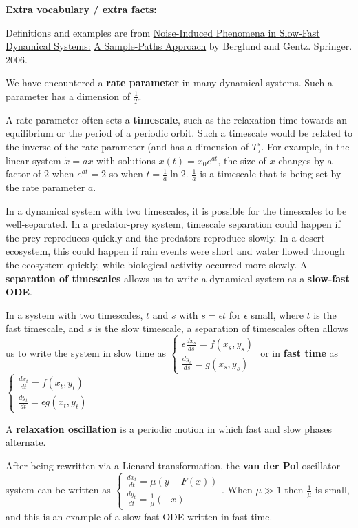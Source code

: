 \documentclass[12pt,letterpaper,noanswers]{exam}
\begin{document}
\noindent \textbf{Extra vocabulary / extra facts:}
\begin{tcolorbox}
Definitions and examples are from \underline{Noise-Induced Phenomena in Slow-Fast Dynamical Systems:} \underline{A Sample-Paths Approach} by Berglund and Gentz.  Springer.  2006.

We have encountered a \textbf{rate parameter} in many dynamical systems.  Such a parameter has a dimension of $\frac{1}{T}$.  

A rate parameter often sets a \textbf{timescale}, such as the relaxation time towards an equilibrium or the period of a periodic orbit.  Such a timescale would be related to the inverse of the rate parameter (and has a dimension of $T$).  For example, in the linear system $\dot x = a x$ with solutions $x(t) = x_0e^{at}$, the size of $x$ changes by a factor of $2$ when $e^{at} = 2$ so when $t = \frac{1}{a}\ln 2$.  $\frac{1}{a}$ is a timescale that is being set by the rate parameter $a$.

In a dynamical system with two timescales, it is possible for the timescales to be well-separated.  In a predator-prey system, timescale separation could happen if the prey reproduces quickly and the predators reproduce slowly.  In a desert ecosystem, this could happen if rain events were short and water flowed through the ecosystem quickly, while biological activity occurred more slowly.  A \textbf{separation of timescales} allows us to write a dynamical system as a \textbf{slow-fast ODE}.
\end{tcolorbox}
\begin{tcolorbox}
In a system with two timescales, $t$ and $s$ with $s = \epsilon t $ for $\epsilon$ small, where $t$ is the fast timescale, and $s$ is the slow timescale, a separation of timescales often allows us to write the system in slow time as $\displaystyle\left\{\begin{array}{c} \epsilon \frac{dx_s}{ds} = f(x_s,y_s) \\ \frac{dy_s}{ds} = g(x_s,y_s) \end{array}\right.$ or in \textbf{fast time} as $\displaystyle\left\{\begin{array}{c} \frac{dx_t}{dt} = f(x_t,y_t) \\ \frac{dy_t}{dt} = \epsilon g(x_t,y_t) \end{array}\right.$

A \textbf{relaxation oscillation} is a periodic motion in which fast and slow phases alternate.

After being rewritten via a Lienard transformation, the \textbf{van der Pol} oscillator system can be written as $\displaystyle\left\{\begin{array}{c} \frac{dx_t}{dt} = \mu(y-F(x)) \\ \frac{dy_t}{dt} = \frac{1}{\mu} (-x) \end{array}\right.$.  When $\mu \gg 1$ then $\frac{1}{\mu}$ is small, and this is an example of a slow-fast ODE written in fast time.
\end{tcolorbox}
\end{document}
